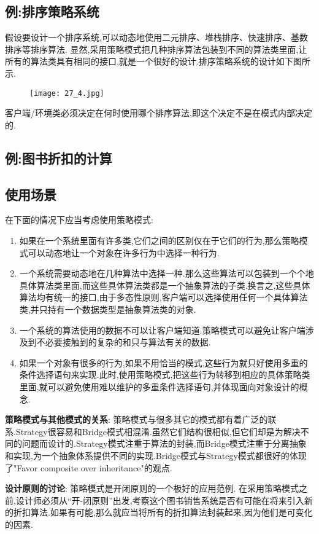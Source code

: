 \documentclass[../main.tex]{subfiles}
\begin{document}
\subsection{例:排序策略系统}
\noindent 假设要设计一个排序系统,可以动态地使用二元排序、堆栈排序、快速排序、基数排序等排序算法.
显然,采用策略模式把几种排序算法包装到不同的算法类里面,让所有的算法类具有相同的接口,就是一个很好的设计.排序策略系统的设计如下图所示.
%
\begin{figure}[H]
  \texttt{[image: 27\_4.jpg]}
\end{figure}
%
\noindent 客户端/环境类必须决定在何时使用哪个排序算法,即这个决定不是在模式内部决定的.
%
\subsection{例:图书折扣的计算}





%
\subsection{使用场景}
在下面的情况下应当考虑使用策略模式:
%
\begin{enumerate}
  \item 如果在一个系统里面有许多类,它们之间的区别仅在于它们的行为,那么策略模式可以动态地让一个对象在许多行为中选择一种行为.
  \item 一个系统需要动态地在几种算法中选择一种.那么这些算法可以包装到一个个地具体算法类里面,而这些具体算法类都是一个抽象算法的子类.换言之,这些具体算法均有统一的接口,由于多态性原则,客户端可以选择使用任何一个具体算法类,并只持有一个数据类型是抽象算法类的对象.
  \item 一个系统的算法使用的数据不可以让客户端知道.策略模式可以避免让客户端涉及到不必要接触到的复杂的和只与算法有关的数据.
  \item 如果一个对象有很多的行为,如果不用恰当的模式,这些行为就只好使用多重的条件选择语句来实现.此时,使用策略模式,把这些行为转移到相应的具体策略类里面,就可以避免使用难以维护的多重条件选择语句,并体现面向对象设计的概念.
\end{enumerate}
%
\textbf{策略模式与其他模式的关系}:
策略模式与很多其它的模式都有着广泛的联系.Strategy很容易和Bridge模式相混淆.虽然它们结构很相似,但它们却是为解决不同的问题而设计的.Strategy模式注重于算法的封装,而Bridge模式注重于分离抽象和实现,为一个抽象体系提供不同的实现.Bridge模式与Strategy模式都很好的体现了"Favor composite over inheritance"的观点.

\textbf{设计原则的讨论}:
策略模式是开闭原则的一个极好的应用范例.
在采用策略模式之前,设计师必须从``开-闭原则''出发,考察这个图书销售系统是否有可能在将来引入新的折扣算法.如果有可能,那么就应当将所有的折扣算法封装起来,因为他们是可变化的因素.
%
\end{document}
